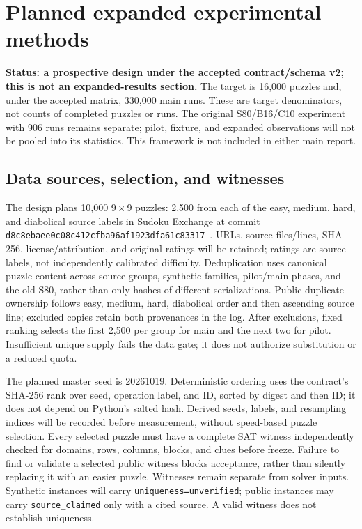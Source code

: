 \section{Planned expanded experimental methods}
\label{sec:expanded-methods-en}
\textbf{Status: a prospective design under the accepted contract/schema v2;
this is not an expanded-results section.}
The target is 16,000 puzzles and, under the accepted matrix, 330,000 main runs.
These are target denominators, not counts of completed puzzles or runs.
The original S80/B16/C10 experiment with 906 runs remains separate;
pilot, fixture, and expanded observations will not be pooled into its statistics.
This framework is not included in either main report.

\subsection{Data sources, selection, and witnesses}
The design plans 10,000 $9\times9$ puzzles: 2,500 from each of the easy,
medium, hard, and diabolical source labels in Sudoku Exchange at commit
\texttt{d8c8ebaee0c08c412cfba96af1923dfa61c83317}~\cite{sudoku-exchange-data}.
URLs, source files/lines, SHA-256, license/attribution, and original ratings
will be retained; ratings are source labels, not independently calibrated difficulty.
Deduplication uses canonical puzzle content across source groups, synthetic
families, pilot/main phases, and the old S80, rather than only hashes of
different serializations. Public duplicate ownership follows easy, medium,
hard, diabolical order and then ascending source line; excluded copies retain
both provenances in the log. After exclusions, fixed ranking selects the first
2,500 per group for main and the next two for pilot. Insufficient unique supply
fails the data gate; it does not authorize substitution or a reduced quota.

The planned master seed is 20261019. Deterministic ordering uses the contract's
SHA-256 rank over seed, operation label, and ID, sorted by digest and then ID;
it does not depend on Python's salted hash. Derived seeds, labels, and
resampling indices will be recorded before measurement, without speed-based
puzzle selection. Every selected puzzle must have a complete SAT witness
independently checked for domains, rows, columns, blocks, and clues before
freeze. Failure to find or validate a selected public witness blocks acceptance,
rather than silently replacing it with an easier puzzle. Witnesses remain
separate from solver inputs. Synthetic instances will carry
\texttt{uniqueness=unverified}; public instances may carry
\texttt{source\_claimed} only with a cited source. A valid witness does not
establish uniqueness.

